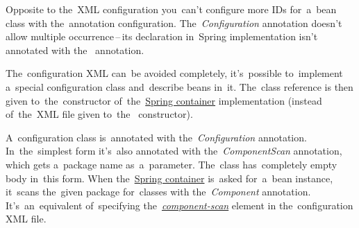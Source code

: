 \warning Opposite to the~XML configuration you~can't configure more IDs for~a~bean class with the~annotation configuration.
The~\textit{Configuration} annotation doesn't allow multiple occurrence\,--\,its declaration in~Spring implementation isn't annotated with the~ annotation.
\newpage

\label{iocnoxml}
The~configuration XML can~be avoided completely, it's~possible to~implement a~special configuration class and~describe beans in~it.
The~class reference is then given to~the~constructor of~the~\hyperref[springcontainrer]{Spring container} implementation  (instead of~the~XML file given to~the~ constructor).

A~configuration class is~annotated with the~\textit{Configuration} annotation.
In~the~simplest form it's~also annotated with the~\textit{ComponentScan} annotation, which gets a~package name as~a~parameter.
The~class has~completely empty body in~this form.
When the~\hyperref[springcontainrer]{Spring container} is~asked for~a~bean instance, it~scans the~given package for~classes with the~\textit{Component} annotation.
It's~an~equivalent of~specifying the~\hyperref[iocannotations]{\textit{component-scan}} element in the~configuration XML file.\\

